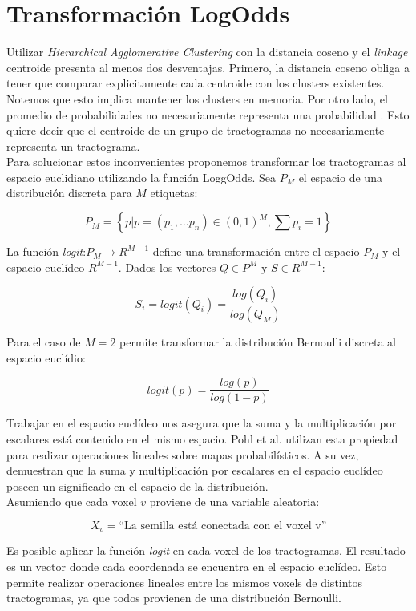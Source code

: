 \section{Transformaci\'on LogOdds}

Utilizar \textit{Hierarchical Agglomerative Clustering} con la distancia 
coseno y el \textit{linkage} centroide presenta al menos dos desventajas. 
Primero, la distancia coseno obliga a tener que comparar explicitamente cada
centroide con los clusters existentes. Notemos que esto implica mantener los
clusters en memoria. Por otro lado, el promedio de probabilidades no
necesariamente representa una probabilidad \cite{Pohl2007}. Esto quiere decir
que el centroide de un grupo de tractogramas no necesariamente representa un
tractograma. \\

Para solucionar estos inconvenientes proponemos transformar los tractogramas 
al espacio euclidiano utilizando la funci\'on LoggOdds. Sea $P_M$ el espacio 
de una distribuci\'on discreta para $M$ etiquetas: 

$$P_M = \left\{  p | p = (p_1,\dots p_n) \in (0,1)^M , \sum{p_i} = 1 \right\}$$

La funci\'on \textit{logit}:$P_M \rightarrow R^{M-1}$ define una transformaci\'on
entre el espacio $P_M$ y el espacio eucl\'ideo $R^{M-1}$. Dados los vectores $Q \in P^M$ y
$S \in R^{M-1}$:

$$S_i = logit(Q_i) = \frac{log(Q_i)}{log(Q_M)}$$

Para el caso de $M=2$ permite transformar la distribuci\'on Bernoulli
discreta al espacio eucl\'idio:

$$logit(p) = \frac{log(p)}{log(1-p)}$$

Trabajar en el espacio eucl\'ideo nos asegura que la suma y la multiplicaci\'on
por escalares est\'a contenido en el mismo espacio. Pohl et al. \cite{Pohl2007} 
utilizan esta propiedad para realizar operaciones lineales sobre mapas
probabil\'isticos. A su vez, demuestran que la suma y multiplicaci\'on
por escalares en el espacio eucl\'ideo poseen un significado en el espacio de la
distribuci\'on. \\

Asumiendo que cada voxel $v$ proviene de una variable aleatoria:

 $$X_v= \textrm{``La semilla est\'a conectada con el voxel v''}$$
 
Es posible aplicar la funci\'on \textit{logit} en cada voxel de los tractogramas.
El resultado es un vector donde cada coordenada se encuentra en el espacio
eucl\'ideo. Esto permite realizar operaciones lineales entre los mismos voxels
de distintos tractogramas, ya que todos provienen de una distribuci\'on
Bernoulli.\\

